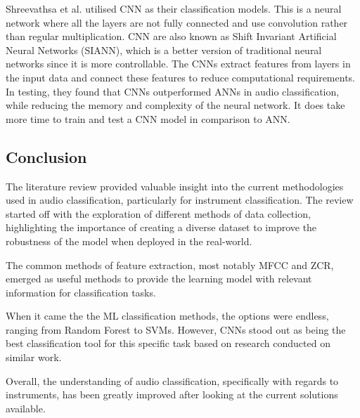 \documentclass[class=report,11pt,crop=false]{standalone}
\begin{document}
Shreevathsa et al. \cite{Shreevathsa_2020} utilised CNN as their classification models. This is a neural network where all the layers are not fully connected and use convolution rather than regular multiplication. CNN are also known as Shift Invariant Artificial Neural Networks (SIANN), which is a better version of traditional neural networks since it is more controllable. The CNNs extract features from layers in the input data and connect these features to reduce computational requirements. In testing, they found that CNNs outperformed ANNs in audio classification, while reducing the memory and complexity of the neural network. It does take more time to train and test a CNN model in comparison to ANN. 

\subsection{Conclusion}
The literature review provided valuable insight into the current methodologies used in audio classification, particularly for instrument  classification. The review started off with the exploration of different methods of data collection, highlighting the importance of creating a diverse dataset to improve the robustness of the model when deployed in the real-world.  

The common methods of feature extraction, most notably MFCC and ZCR, emerged as useful methods to provide the learning model with relevant information for classification tasks. 

When it came the the ML classification methods, the options were endless, ranging from Random Forest to SVMs. However, CNNs stood out as being the best classification tool for this specific task based on research conducted on similar work. 

Overall, the understanding of audio classification, specifically with regards to instruments, has been greatly improved after looking at the current solutions available. 


\ifstandalone

\printnoidxglossary[type=\acronymtype,nonumberlist]
\fi
\end{document}
